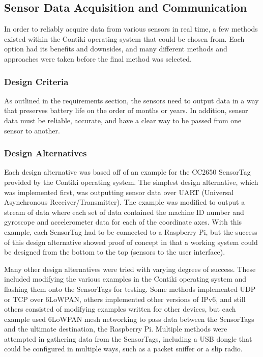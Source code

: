 \documentclass[PPFS.tex]{template/subfiles}
\begin{document}
\subsection{Sensor Data Acquisition and Communication}
In order to reliably acquire data from various sensors in real time, a few methods existed within the Contiki operating system that could be chosen from. Each option had its benefits and downsides, and many different methods and approaches were taken before the final method was selected.

\subsubsection{Design Criteria}
As outlined in the requirements section, the sensors need to output data in a way that preserves battery life on the order of months or years. In addition, sensor data must be reliable, accurate, and have a clear way to be passed from one sensor to another.

\subsubsection{Design Alternatives}
Each design alternative was based off of an example for the CC2650 SensorTag provided by the Contiki operating system. The simplest design alternative, which was implemented first, was outputting sensor data over UART (Universal Asynchronous Receiver/Transmitter). The example was modified to output a stream of data where each set of data contained the machine ID number and gyroscope and accelerometer data for each of the coordinate axes. With this example, each SensorTag had to be connected to a Raspberry Pi, but the success of this design alternative showed proof of concept in that a working system could be designed from the bottom to the top (sensors to the user interface).

Many other design alternatives were tried with varying degrees of success. These included modifying the various examples in the Contiki operating system and flashing them onto the SensorTags for testing. Some methods implemented UDP or TCP over 6LoWPAN, others implemented other versions of IPv6, and still others consisted of modifying examples written for other devices, but each example used 6LoWPAN mesh networking to pass data between the SensorTags and the ultimate destination, the Raspberry Pi. Multiple methods were attempted in gathering data from the SensorTags, including a USB dongle that could be configured in multiple ways, such as a packet sniffer or a slip radio.
\end{document}
